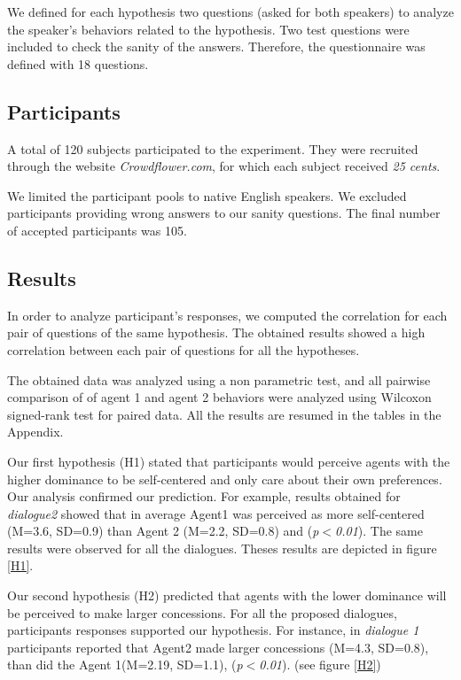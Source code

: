 \documentclass{llncs}
\begin{document}
				We defined for each hypothesis two questions (asked for both speakers) to analyze the speaker's behaviors related to the hypothesis. 
				Two test questions were included to check the sanity of the answers. Therefore, the questionnaire was defined with 18 questions.
				
				\subsection{Participants}
				A total of 120 subjects participated to the experiment. They were recruited through the website \emph{Crowdflower.com}, for which each subject received \textit{25 cents}. 
				
				We limited the participant pools to native English speakers. We excluded participants providing wrong answers to our sanity questions. The final number of accepted participants was 105. 
				
				\subsection{Results}
				 In order to analyze participant's responses, we computed the correlation for each pair of questions of the same hypothesis. The obtained results showed a high correlation between each pair of questions for all the hypotheses.
				
				The obtained data was analyzed using a non parametric test, and all pairwise comparison of of agent 1 and agent 2 behaviors were analyzed using Wilcoxon signed-rank test for paired data. All the results are resumed in the tables in the Appendix.
				
				\par Our first hypothesis (H1) stated that participants would perceive agents with the higher dominance to be self-centered and only care about their own preferences. Our analysis confirmed our prediction. For example, results obtained for \textit{dialogue2} showed that in average Agent1 was perceived as more self-centered (M=3.6, SD=0.9) than Agent 2 (M=2.2, SD=0.8) and (\textit{p$<$0.01}). The same results were observed for all the dialogues. Theses results are depicted in figure \ref{H1}.
				
				\par Our second hypothesis (H2) predicted that agents with the lower dominance will be perceived to make larger concessions. For all the proposed dialogues, participants responses supported our hypothesis. 
				For instance, in \textit{dialogue 1} participants reported that Agent2 made larger concessions (M=4.3, SD=0.8), than did the Agent 1(M=2.19, SD=1.1), (\textit{p$<$0.01}).  (see figure  \ref{H2})
				
\end{document}
